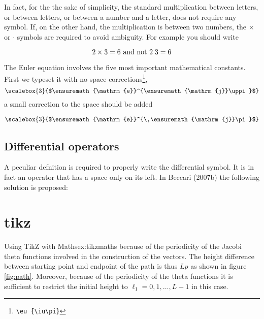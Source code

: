 {In fact, for the the sake of simplicity, the standard multiplication between letters, or between letters, or between a number and a letter, does not require any symbol. If, on the other hand, the multiplication is between two numbers, the $\times$ or $\cdot$ symbols are required to avoid ambiguity.
For example you should write

\[2\times 3=6 \text{ and not } 2\thickspace 3=6 \]



The Euler equation involves the five most important mathematical constants. First we typeset it with no space corrections\footnote{\texttt{\textbackslash eu\^\,\{\textbackslash iu\textbackslash pi\}}},
\providecommand*{\eu}%
{\ensuremath{\mathrm{e}}}
\providecommand*{\iu}%
{\ensuremath{\mathrm{j}}}
\[\scalebox{3}{$\eu^{\iu\uppi}$}\]
a small correction to the space should be added

\[\scalebox{3}{$\eu^{\,\iu\pi}$}\]

\subsection{Differential operators}
A peculiar defnition is required to properly
write the differential symbol. It is in fact an operator that has a space only on its left. In Beccari (2007b) the following solution is proposed:

\bigskip


\clearpage
\section{tikz}
\begin{texexample}{Using TikZ with Maths}{ex:tikzmaths}
because of the periodicity of the Jacobi theta functions involved in the construction of the vectors.
The height difference between starting point and endpoint of the path is thus $Lp$ as shown in figure \ref{fig:path}. Moreover, because of the periodicity of the theta functions it is sufficient to restrict the initial height to $\ell_1=0,1,\dots,L-1$ in this case.

{  \centering
  }
\end{texexample}}
